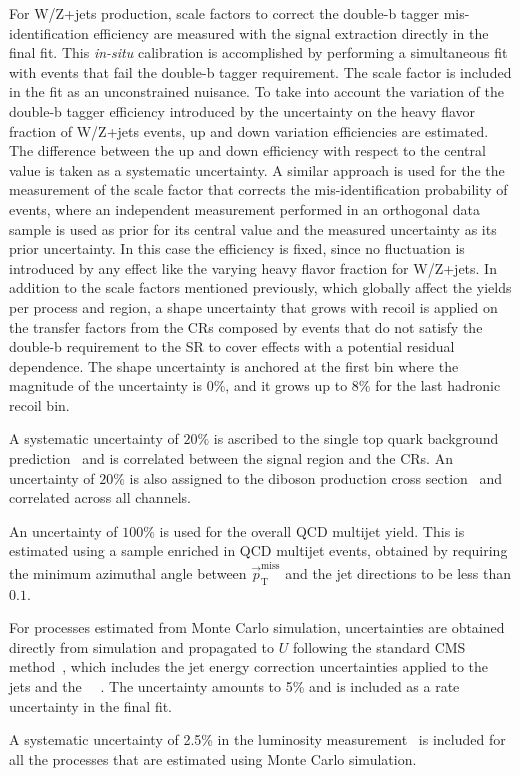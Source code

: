 %
For W/Z+jets production, scale factors to correct the double-b tagger
mis-identification efficiency are measured with the signal extraction
directly in the final fit. This {\it in-situ} calibration is
accomplished by performing a simultaneous fit with events that fail the double-b tagger requirement. The scale factor is included in the fit as an unconstrained nuisance.
%
To take into account the variation of the double-b tagger efficiency introduced by the uncertainty on the heavy flavor fraction of W/Z+jets events, up and down variation efficiencies are estimated. The difference between the up and down efficiency with respect to the central value is taken as a systematic uncertainty. 
%
A similar approach is used for the the measurement of the scale factor that corrects the mis-identification probability of \ttbar events, where an independent measurement performed in an orthogonal data sample is used as prior for its central value and the measured uncertainty as its prior uncertainty. In this case the efficiency is fixed, since no fluctuation is introduced by any effect like the varying heavy flavor fraction for W/Z+jets.
%
In addition to the scale factors mentioned previously, which globally affect the yields per process and region, a shape uncertainty that grows with recoil is applied on the transfer factors from the CRs composed by events that do not satisfy the double-b requirement to the SR to cover effects with a potential residual \pt dependence. The shape uncertainty is anchored at the first bin where the magnitude of the uncertainty is 0\%, and it grows up to 8\% for the last hadronic recoil bin.
 
%
A systematic uncertainty of $20\%$ is ascribed to the single top quark background prediction~\cite{Chatrchyan:1642680} and is correlated between the signal region and the CRs. 
%
An uncertainty of $20\%$ is also assigned to the diboson production cross section~\cite{Khachatryan:2016txa,Khachatryan:2016tgp} and correlated across all channels. 
%

An uncertainty of $100\%$ is used for the overall QCD multijet yield. 
%
This is estimated using a sample enriched in QCD multijet events, obtained by requiring the minimum azimuthal angle between $\vec{p}_{\mathrm{T}}^{\mathrm{miss}}$ and the jet directions to be less than $0.1$. 
%

For processes estimated from Monte Carlo simulation, \MET uncertainties are obtained directly from simulation and propagated to $U$ following the standard CMS method~\cite{Khachatryan:2014gga}, which includes the jet energy correction uncertainties applied to the jets and the \MET\ ~\cite{jec}. 
%
The \MET uncertainty amounts to 5\% and is included as a rate uncertainty in the final fit.
%

A systematic uncertainty of 2.5\% in the luminosity measurement~\cite{CMS-PAS-LUM-17-001} is included for all the processes that are estimated using Monte Carlo simulation.
%

